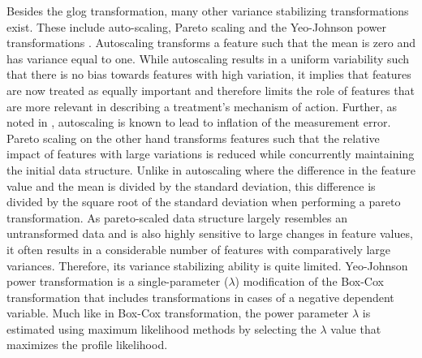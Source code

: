 \documentclass[11pt]{article}
\begin{document}
\par{Besides the glog transformation, many other variance stabilizing transformations exist. These include auto-scaling, Pareto scaling \cite{VandenBerg2006} and the Yeo-Johnson power transformations \cite{yeo2000, Weisberg2001}. Autoscaling transforms a feature such that the mean is zero and has variance equal to one. While autoscaling results in a uniform variability such that there is no bias towards features with high variation, it implies that features are now treated as equally important and therefore limits the role of features that are more relevant in describing a treatment's mechanism of action. Further, as noted in \cite{VandenBerg2006}, autoscaling is known to lead to inflation of the measurement error. Pareto scaling on the other hand transforms features such that the relative impact of features with large variations is reduced while concurrently maintaining the initial data structure. Unlike in autoscaling where the difference in the feature value and the mean is divided by the standard deviation, this difference is divided by the square root of the standard deviation when performing a pareto transformation. As pareto-scaled data structure largely resembles an untransformed data and is also highly sensitive to large changes in feature values, it often results in a considerable number of features with comparatively large variances. Therefore, its variance stabilizing ability is quite limited. Yeo-Johnson power transformation is a single-parameter ($\lambda$) modification of the Box-Cox transformation \cite{Box1964} that includes transformations in cases of a negative dependent variable. Much like in Box-Cox transformation, the power parameter $\lambda$ is estimated using maximum likelihood methods by selecting the $\lambda$ value that maximizes the profile likelihood. }
\end{document}
